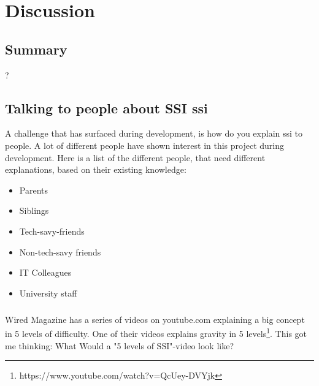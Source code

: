 \chapter{Discussion}

\section{Summary}

?

\section{Talking to people about SSI \acrfull{ssi}}

A challenge that has surfaced during development, is how do you explain \acrshort{ssi} to people. A lot of different people have shown interest in this project during development. Here is a list of the different people, that need different explanations, based on their existing knowledge:

\begin{itemize}
    \item Parents
    \item Siblings
    \item Tech-savy-friends
    \item Non-tech-savy friends
    \item IT Colleagues
    \item University staff
\end{itemize}

\paragraph{}
Wired Magazine has a series of videos on youtube.com explaining a big concept in 5 levels of difficulty. One of their videos explains gravity in 5 levels\footnote{https://www.youtube.com/watch?v=QcUey-DVYjk}. This got me thinking: What Would a "5 levels of SSI"-video look like?

